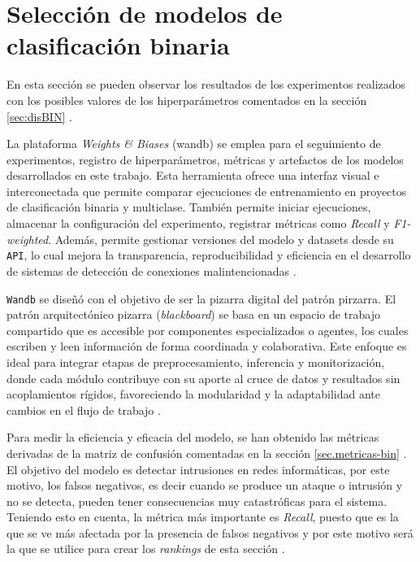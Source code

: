 \section{Selección de modelos de clasificación binaria}
En esta sección se pueden observar los resultados de los experimentos realizados con los posibles valores de los hiperparámetros comentados en la sección \ref{sec:disBIN} .

La plataforma \textit{Weights \& Biases} (wandb) se emplea para el seguimiento de experimentos, registro de hiperparámetros, métricas y artefactos de los modelos desarrollados en este trabajo. Esta herramienta ofrece una interfaz visual e interconectada que permite comparar ejecuciones de entrenamiento en proyectos de clasificación binaria y multiclase. También permite iniciar ejecuciones, almacenar la configuración del experimento, registrar métricas como \textit{Recall} y \textit{F1-weighted}. Además, permite gestionar versiones del modelo y datasets desde su \texttt{API}, lo cual mejora la transparencia, reproducibilidad y eficiencia en el desarrollo de sistemas de detección de conexiones malintencionadas \cite{wandb_tracking}.

\texttt{Wandb} se diseñó con el objetivo de ser la pizarra digital del patrón pirzarra. El patrón arquitectónico pizarra (\textit{blackboard}) se basa en un espacio de trabajo compartido que es accesible por componentes especializados o agentes, los cuales escriben y leen información de forma coordinada y colaborativa. Este enfoque es ideal para integrar etapas de preprocesamiento, inferencia y monitorización, donde cada módulo contribuye con su aporte al cruce de datos y resultados sin acoplamientos rígidos, favoreciendo la modularidad y la adaptabilidad ante cambios en el flujo de trabajo \cite{blackboard_architecture}.

Para medir la eficiencia y eficacia del modelo, se han obtenido las métricas derivadas de la matriz de confusión comentadas en la sección \ref{sec.metricas-bin} . El objetivo del modelo es detectar intrusiones en redes informáticas, por este motivo, los falsos negativos, es decir cuando se produce un ataque o intrusión y no se detecta, pueden tener consecuencias muy catastróficas para el sistema. Teniendo esto en cuenta, la métrica más importante es \textit{Recall}, puesto que es la que se ve más afectada por la presencia de falsos negativos y por este motivo será la que se utilice para crear los \textit{rankings} de esta sección .

